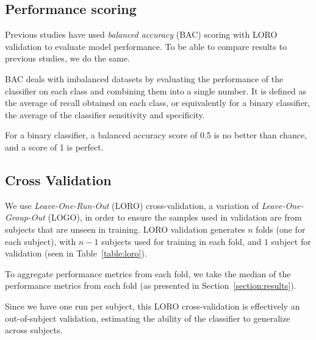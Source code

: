     \subsection{Performance scoring}

        Previous studies have used \emph{balanced accuracy} (BAC) scoring with LORO validation to evaluate model performance. To be able to compare results to previous studies, we do the same. 

        BAC deals with imbalanced datasets by evaluating the performance of the classifier on each class and combining them into a single number. It is defined as the average of recall obtained on each class, or equivalently for a binary classifier, the average of the classifier sensitivity and specificity. 

        For a binary classifier, a balanced accuracy score of 0.5 is no better than chance, and a score of 1 is perfect.

    \subsection{Cross Validation}

        We use \emph{Leave-One-Run-Out} (LORO) cross-validation, a variation of \emph{Leave-One-Group-Out} (LOGO), in order to ensure the samples used in validation are from subjects that are unseen in training. LORO validation generates $n$ folds (one for each subject), with $n-1$ subjects used for training in each fold, and $1$ subject for validation (seen in Table~\ref{table:loro}).

        

        To aggregate performance metrics from each fold, we take the median of the performance metrics from each fold (as presented in Section~\ref{section:results}).

        Since we have one run per subject, this LORO cross-validation is effectively an out-of-subject validation, estimating the ability of the classifier to generalize across subjects.

